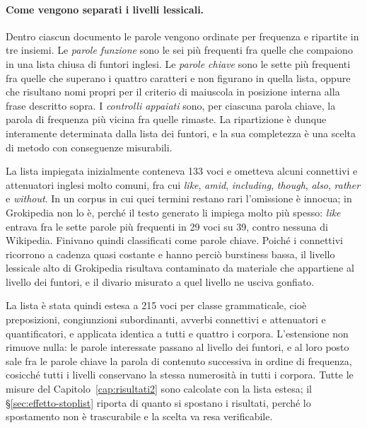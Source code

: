 \paragraph{Come vengono separati i livelli lessicali.}
\label{par:livelli-lessicali}
Dentro ciascun documento le parole vengono ordinate per frequenza e ripartite in
tre insiemi. Le \emph{parole funzione} sono le sei più frequenti fra quelle che
compaiono in una lista chiusa di funtori inglesi. Le \emph{parole chiave} sono
le sette più frequenti fra quelle che superano i quattro caratteri e non
figurano in quella lista, oppure che risultano nomi propri per il criterio di
maiuscola in posizione interna alla frase descritto sopra. I \emph{controlli
appaiati} sono, per ciascuna parola chiave, la parola di frequenza più vicina
fra quelle rimaste. La ripartizione è dunque interamente determinata dalla lista
dei funtori, e la sua completezza è una scelta di metodo con conseguenze
misurabili.

La lista impiegata inizialmente conteneva \num{133} voci e ometteva alcuni
connettivi e attenuatori inglesi molto comuni, fra cui \emph{like},
\emph{amid}, \emph{including}, \emph{though}, \emph{also}, \emph{rather} e
\emph{without}. In un corpus in cui quei termini restano rari l'omissione è
innocua; in Grokipedia non lo è, perché il testo generato li impiega molto più
spesso: \emph{like} entrava fra le sette parole più frequenti in \num{29} voci
su \num{39}, contro nessuna di Wikipedia. Finivano quindi classificati come
parole chiave. Poiché i connettivi ricorrono a cadenza quasi costante e hanno
perciò burstiness bassa, il livello lessicale alto di Grokipedia risultava
contaminato da materiale che appartiene al livello dei funtori, e il divario
misurato a quel livello ne usciva gonfiato.

La lista è stata quindi estesa a \num{215} voci per classe grammaticale, cioè
preposizioni, congiunzioni subordinanti, avverbi connettivi e attenuatori e
quantificatori, e applicata identica a tutti e quattro i corpora. L'estensione
non rimuove nulla: le parole interessate passano al livello dei funtori, e al
loro posto sale fra le parole chiave la parola di contenuto successiva in
ordine di frequenza, cosicché tutti i livelli conservano la stessa numerosità
in tutti i corpora. Tutte le misure del Capitolo~\ref{cap:risultati2} sono
calcolate con la lista estesa; il §\ref{sec:effetto-stoplist} riporta di
quanto si spostano i risultati, perché lo spostamento non è trascurabile e la
scelta va resa verificabile.

